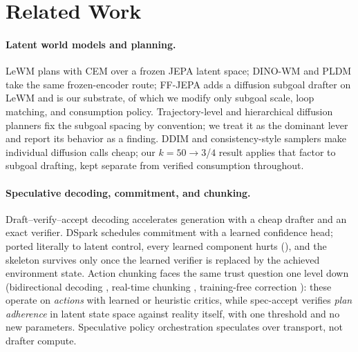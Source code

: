 \documentclass{article}
\begin{document}
\section{Related Work}
\label{sec:related}

\paragraph{Latent world models and planning.} LeWM \citep{lewm} plans with CEM
\citep{cem} over a frozen JEPA latent space; DINO-WM \citep{dinowm} and PLDM
\citep{pldm} take the same frozen-encoder route; FF-JEPA \citep{ffjepa} adds a
diffusion subgoal drafter on LeWM and is our substrate, of which we modify only
subgoal scale, loop matching, and consumption policy. Trajectory-level and
hierarchical diffusion planners \citep{janner2022diffuser,chen2024hierarchical}
fix the subgoal spacing by convention; we treat it as the dominant lever and
report its behavior as a finding. DDIM \citep{ddim} and consistency-style
samplers \citep{consistency} make individual diffusion calls cheap; our
$k{=}50\to3$/$4$ result applies that factor to subgoal drafting, kept separate
from verified consumption throughout.

\paragraph{Speculative decoding, commitment, and chunking.}
Draft--verify--accept decoding \citep{leviathan2023fast,chen2023accelerating}
accelerates generation with a cheap drafter and an exact verifier. DSpark
\citep{dspark} schedules commitment with a learned confidence head; ported
literally to latent control, every learned component hurts
(), and the skeleton survives only once the learned
verifier is replaced by the achieved environment state. Action chunking faces
the same trust question one level down (bidirectional decoding \citep{bid},
real-time chunking \citep{rtc}, training-free correction \citep{dcdp}): these
operate on \emph{actions} with learned or heuristic critics, while spec-accept
verifies \emph{plan adherence} in latent state space against reality itself,
with one threshold and no new parameters. Speculative policy orchestration
\citep{spo} speculates over transport, not drafter compute.

\end{document}
